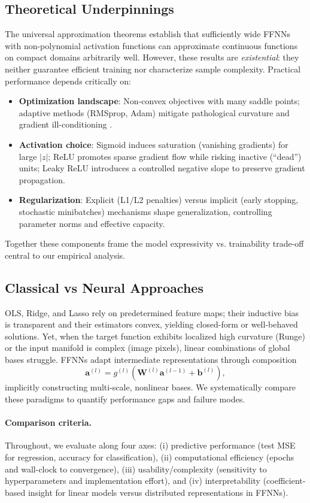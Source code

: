 \documentclass[amssymb,twocolumn,aps]{revtex4}
\begin{document}
\subsection*{Theoretical Underpinnings}
The universal approximation theorems \cite{cybenko1989,hornik1991} establish that sufficiently wide FFNNs with non-polynomial activation functions can approximate continuous functions on compact domains arbitrarily well. However, these results are \emph{existential}: they neither guarantee efficient training nor characterize sample complexity. Practical performance depends critically on:
\begin{itemize}
    \item \textbf{Optimization landscape}: Non-convex objectives with many saddle points; adaptive methods (RMSprop, Adam) mitigate pathological curvature and gradient ill-conditioning \cite{kingma2014adam}.
    \item \textbf{Activation choice}: Sigmoid induces saturation (vanishing gradients) for large $|z|$; ReLU promotes sparse gradient flow while risking inactive (“dead”) units; Leaky ReLU introduces a controlled negative slope to preserve gradient propagation.
    \item \textbf{Regularization}: Explicit (L1/L2 penalties) versus implicit (early stopping, stochastic minibatches) mechanisms shape generalization, controlling parameter norms and effective capacity.
\end{itemize}
Together these components frame the model expressivity vs. trainability trade-off central to our empirical analysis.

\subsection*{Classical vs Neural Approaches}
OLS, Ridge, and Lasso rely on predetermined feature maps; their inductive bias is transparent and their estimators convex, yielding closed-form or well-behaved solutions. Yet, when the target function exhibits localized high curvature (Runge) or the input manifold is complex (image pixels), linear combinations of global bases struggle. FFNNs adapt intermediate representations through composition
\[
    \mathbf{a}^{(l)} = g^{(l)}\!\left(\mathbf{W}^{(l)}\mathbf{a}^{(l-1)} + \mathbf{b}^{(l)}\right),
\]
implicitly constructing multi-scale, nonlinear bases. We systematically compare these paradigms to quantify performance gaps and failure modes.

\paragraph{Comparison criteria.} Throughout, we evaluate along four axes: (i) predictive performance (test MSE for regression, accuracy for classification), (ii) computational efficiency (epochs and wall-clock to convergence), (iii) usability/complexity (sensitivity to hyperparameters and implementation effort), and (iv) interpretability (coefficient-based insight for linear models versus distributed representations in FFNNs).
\end{document}
